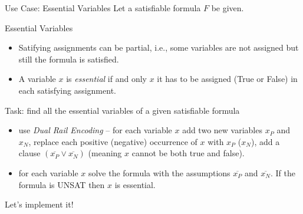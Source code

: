\documentclass[t]{sdqbeamer}
\begin{document}
\begin{frame}{Use Case: Essential Variables}
Let a satisfiable formula $F$ be given.
\begin{block}{Essential Variables}
\begin{itemize}\setlength{\itemsep}{1em}
	\item Satifying assignments can be partial, i.e., some variables are not assigned but still the formula is satisfied.
	\item A variable $x$ is \emph{essential} if and only $x$ it has to be assigned (True or False) in each satisfying assignment.
\end{itemize}
\end{block}
\begin{block}{Task: find all the essential variables of a given satisfiable formula}
	\begin{itemize}\setlength{\itemsep}{1ex}
		\item use \emph{Dual Rail Encoding} -- for each variable $x$ add two new variables $x_P$ and $x_N$,
		replace each positive (negative) occurrence of $x$ with $x_P$ ($x_N$), add a clause
		$(\overline{x_P} \vee \overline{x_N})$ (meaning $x$ cannot be both true and false).
		\item for each variable $x$ solve the formula with the assumptions $\overline{x_P}$ and
		$\overline{x_N}$. If the formula is UNSAT then $x$ is essential.
	\end{itemize}
\end{block}
\begin{alert}{Let's implement it!}
	
\end{alert}
\end{frame}



% 
% 

\end{document}
